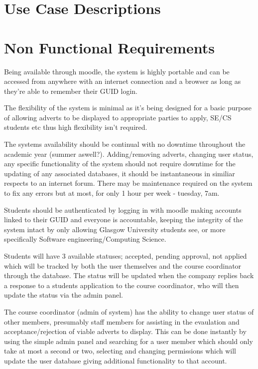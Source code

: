 \documentclass{l3deliverable}
\begin{document}

\section{Use Case Descriptions}



\section{Non Functional Requirements}

Being available through moodle, the system is highly portable and can be accessed from anywhere with an internet connection and a browser as long as they're able to remember their GUID login.

The flexibility of the system is minimal as it's being designed for a basic purpose of allowing adverts to be displayed to appropriate parties to apply, SE/CS students etc thus high flexibility isn't required.

The systems availability should be continual with no downtime throughout the academic year (summer aswell?). Adding/removing adverts, changing user status, any specific functionality of the system should not require downtime for the updating of any associated databases, it should be instantaneous in similiar respects to an internet forum. There may be maintenance required on the system to fix any errors but at most, for only 1 hour per week - tuesday, 7am.

Students should be authenticated by logging in with moodle making accounts linked to their GUID and everyone is accountable, keeping the integrity of the system intact by only allowing Glasgow University students see, or more specifically Software engineering/Computing Science.

Students will have 3 available statuses; accepted, pending approval, not applied which will be tracked by both the user themselves and the course coordinator through the database. The status will be updated when the company replies back a response to a students application to the course coordinator, who will then update the status via the admin panel.

The course coordinator (admin of system) has the ability to change user status of other members, presumably staff members for assisting in the evaulation and acceptance/rejection of viable adverts to display. This can be done instantly by using the simple admin panel and searching for a user member which should only take at most a second or two, selecting and changing permissions which will update the user database giving additional functionality to that account.
\end{document}
